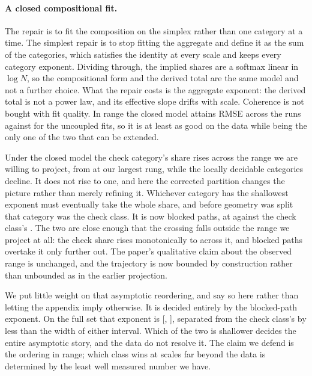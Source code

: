 \documentclass[11pt]{article}
\begin{document}
\paragraph{A closed compositional fit.}
The repair is to fit the composition on the simplex rather than one category at a
time. The simplest repair is to stop fitting the aggregate and define it as the sum
of the categories, which satisfies the identity at every scale and keeps every
category exponent. Dividing through, the implied shares are a softmax linear in
$\log N$, so the compositional form and the derived total are the same model and
not a further choice. What the repair costs is the aggregate exponent: the derived
total is not a power law, and its effective slope drifts with scale. Coherence is not bought with fit quality. In range the closed model
attains RMSE  across the  runs against
 for the uncoupled fits, so it is at least as good on the
data while being the only one of the two that can be extended.

Under the closed model the check category's share rises across the range we are
willing to project, from  at our largest rung, while the locally
decidable categories decline. It does not rise to one, and here the corrected
partition changes the picture rather than merely refining it. Whichever category has
the shallowest exponent must eventually take the whole share, and before geometry was
split that category was the check class. It is now blocked paths, at 
against the check class's . The two are close enough that the crossing
falls outside the range we project at all: the check share rises monotonically to
 across it, and blocked paths overtake it only further out. The paper's
qualitative claim about the observed range is unchanged, and the trajectory is now
bounded by construction rather than unbounded as in the earlier projection.

We put little weight on that asymptotic reordering, and say so here rather than
letting the appendix imply otherwise. It is decided entirely by the blocked-path
exponent. On the full set that exponent is  [,
], separated from the check class's  by less than the width
of either interval. Which of the two is shallower decides the entire asymptotic
story, and the data do not resolve it. The claim we defend is the ordering in range; which class wins at
scales far beyond the data is determined by the least well measured number we have.
\end{document}
